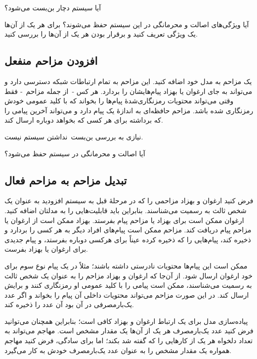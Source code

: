 \documentclass[a4paper]{article}
\begin{document}
آیا سیستم دچار بن‌بست می‌شود؟

آیا ویژگی‌های اصالت و محرمانگی در این سیستم حفظ می‌شوند؟
برای هر یک از آن‌ها یک ویژگی  تعریف کنید و برقرار بودن هر یک از آن‌ها را بررسی کنید.

\subsection{افزودن مزاحم منفعل}

یک مزاحم به مدل خود اضافه کنید.
این مزاحم به تمام ارتباطات شبکه دسترسی دارد و می‌تواند به جای ارغوان یا بهزاد پیام‌هایشان را بردارد.
هر کس ‐ از جمله مزاحم ‐ فقط وقتی می‌تواند محتویات رمزنگاری‌شدهٔ پیام‌ها را بخواند که با کلید عمومی خودش رمزنگاری شده باشد.
مزاحم حافظه‌ای به اندازهٔ یک پیام دارد و می‌تواند آخرین پیامی را که برداشته برای هر کسی که بخواهد دوباره ارسال کند.

نیازی به بررسی بن‌بست~نداشتن سیستم نیست.

آیا اصالت و محرمانگی در سیستم حفظ می‌شود؟

\subsection{تبدیل مزاحم به مزاحم فعال}

فرض کنید ارغوان و بهزاد مزاحمی را که در مرحلهٔ قبل به سیستم افزودید به عنوان یک شخص ثالث به رسمیت می‌شناسند.
بنابراین باید قابلیت‌هایی را به مدلتان اضافه کنید.
ارغوان ممکن است برای بهزاد یا مزاحم پیام بفرستد.
بهزاد ممکن است از ارغوان یا مزاحم پیام دریافت کند.
مزاحم ممکن است
پیام‌های افراد دیگر به هر کسی را بردارد و ذخیره کند،
پیام‌هایی را که ذخیره کرده عیناً برای هرکسی دوباره بفرستد،
و
پیام جدیدی برای ارغوان یا بهزاد بفرست.

ممکن است این پیام‌ها محتویات نادرستی داشته باشند؛ مثلاً  در یک پیام نوع سوم برای خود ارغوان ارسال شود.
از آن‌جا که ارغوان و بهزاد مزاحم را به عنوان یک شخص ثالث به رسمیت می‌شناسند،
ممکن است پیامی را با کلید عمومی او رمزنگاری کنند و برایش ارسال کند.
در این صورت مزاحم می‌تواند محتویات داخلی آن پیام را بخواند و اگر عدد یک‌بارمصرفی در آن بود آن عدد را ذخیره کند.

پیاده‌سازی مدل برای یک ارتباط ارغوان و بهزاد کافی است؛
بنابراین همچنان می‌توانید فرض کنید عدد یک‌بارمصرف هر یک از آن‌ها یک مقدار مشخص است.
مهاجم می‌تواند به تعداد دلخواه هر یک از کارهایی را که گفته شد بکند؛
اما برای سادگی، فرض کنید مهاجم همواره یک مقدار مشخص را به عنوان عدد یک‌بارمصرف خودش به کار می‌گیرد.
\end{document}
